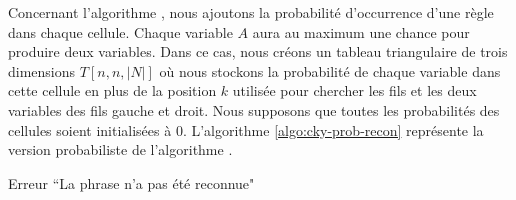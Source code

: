 \documentclass{KodeBook}
\begin{document}
Concernant l'algorithme , nous ajoutons la probabilité d'occurrence d'une règle dans chaque cellule. 
Chaque variable $A$ aura au maximum une chance pour produire deux variables.
Dans ce cas, nous créons un tableau triangulaire de trois dimensions $T[n, n, |N|]$ où nous stockons la probabilité de chaque variable dans cette cellule en plus de la position $k$ utilisée pour chercher les fils et les deux variables des fils gauche et droit.
Nous supposons que toutes les probabilités des cellules soient initialisées à $0$.
L'algorithme \ref{algo:cky-prob-recon} représente la version probabiliste de l'algorithme .
\begin{algorithm}[ht]
	
	
	
	 {
		Erreur ``La phrase n'a pas été reconnue"\;
	}
	
	\caption{Reconnaissance d'une phrase en utilisant la méthode CKY probabiliste}
	\label{algo:cky-prob-recon}
\end{algorithm}
%	
%	
%	
%	
\end{document}
